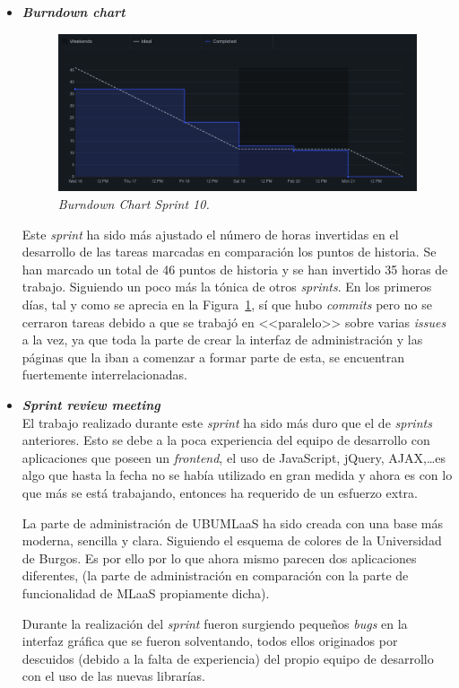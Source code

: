 \begin{itemize}
\item \textbf{\textit{Burndown chart}}\\
\begin{figure}
\begin{center}
\includegraphics[width=\textwidth]{../img/anexos/sprints/BD-Sprint10}
\caption{\textit{Burndown Chart Sprint 10.}}\label{fig:BD-Sprint10}
\end{center}
\end{figure}
Este \textit{sprint} ha sido más ajustado el número de horas invertidas en el desarrollo de las tareas marcadas en comparación los puntos de historia. Se han marcado un total de 46 puntos de historia y se han invertido 35 horas de trabajo. Siguiendo un poco más la tónica de otros \textit{sprints}. En los primeros días, tal y como se aprecia en la Figura~\ref{fig:BD-Sprint10}, sí que hubo \textit{commits} pero no se cerraron tareas debido a que se trabajó en <<paralelo>> sobre varias \textit{issues} a la vez, ya que toda la parte de crear la interfaz de administración y las páginas que la iban a comenzar a formar parte de esta, se encuentran fuertemente interrelacionadas.

\item \textbf{\textit{Sprint review meeting}}\\
El trabajo realizado durante este \textit{sprint} ha sido más duro que el de \textit{sprints} anteriores. Esto se debe a la poca experiencia del equipo de desarrollo con aplicaciones que poseen un \textit{frontend}, el uso de JavaScript, jQuery, AJAX,\dots es algo que hasta la fecha no se había utilizado en gran medida y ahora es con lo que más se está trabajando, entonces ha requerido de un esfuerzo extra.

La parte de administración de UBUMLaaS ha sido creada con una base más moderna, sencilla y clara. Siguiendo el esquema de colores de la Universidad de Burgos. Es por ello por lo que ahora mismo parecen dos aplicaciones diferentes, (la parte de administración en comparación con la parte de funcionalidad de MLaaS propiamente dicha).

Durante la realización del \textit{sprint} fueron surgiendo pequeños \textit{bugs} en la interfaz gráfica que se fueron solventando, todos ellos originados por descuidos (debido a la falta de experiencia) del propio equipo de desarrollo con el uso de las nuevas librarías.
\end{itemize}

